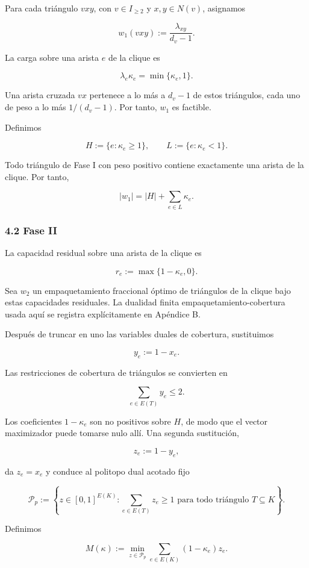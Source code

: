 \documentclass[spanish,11pt,a4paper]{article}
\begin{document}
Para cada triángulo \(vxy\), con \(v\in I_{\ge2}\) y \(x,y\in N(v)\),
asignamos

\[
w_1(vxy)
:=
\frac{\lambda_{xy}}{d_v-1}.
\tag{4.1}
\]

La carga sobre una arista \(e\) de la clique es

\[
\lambda_e\kappa_e
=
\min\{\kappa_e,1\}.
\tag{4.2}
\]

Una arista cruzada \(vx\) pertenece a lo más a \(d_v-1\) de estos
triángulos, cada uno de peso a lo más \(1/(d_v-1)\). Por tanto, \(w_1\)
es factible.

Definimos

\[
H:=\{e:\kappa_e\ge1\},
\qquad
L:=\{e:\kappa_e<1\}.
\]

Todo triángulo de Fase I con peso positivo contiene exactamente una
arista de la clique. Por tanto,

\[
|w_1|
=
|H|+\sum_{e\in L}\kappa_e.
\tag{4.3}
\]

\subsubsection{4.2 Fase II}\label{fase-ii}

La capacidad residual sobre una arista de la clique es

\[
r_e:=\max\{1-\kappa_e,0\}.
\tag{4.4}
\]

Sea \(w_2\) un empaquetamiento fraccional óptimo de triángulos de la
clique bajo estas capacidades residuales. La dualidad finita
empaquetamiento-cobertura usada aquí se registra explícitamente en
Apéndice B.

Después de truncar en uno las variables duales de cobertura, sustituimos

\[
y_e:=1-x_e.
\]

Las restricciones de cobertura de triángulos se convierten en

\[
\sum_{e\in E(T)}y_e\le2.
\]

Los coeficientes \(1-\kappa_e\) son no positivos sobre \(H\), de modo
que el vector maximizador puede tomarse nulo allí. Una segunda
sustitución,

\[
z_e:=1-y_e,
\]

da \(z_e=x_e\) y conduce al politopo dual acotado fijo

\[
\mathcal P_p
:=
\left\{
z\in[0,1]^{E(K)}:
\sum_{e\in E(T)}z_e\ge1
\text{ para todo triángulo }T\subseteq K
\right\}.
\tag{4.5}
\]

Definimos

\[
M(\kappa)
:=
\min_{z\in\mathcal P_p}
\sum_{e\in E(K)}(1-\kappa_e)z_e.
\tag{4.6}
\]
\end{document}
